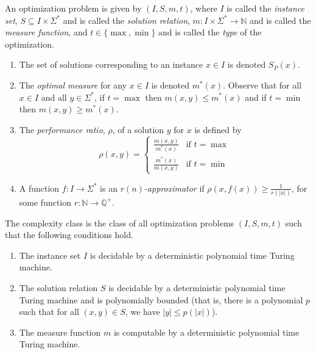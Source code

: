 \documentclass{article}
\begin{document}
\begin{definition}
  An optimization problem is given by $(I, S, m, t)$, where $I$ is called the \emph{instance set}, $S \subseteq I \times \Sigma^*$ and is called the \emph{solution relation}, $m \colon I \times \Sigma^* \to \mathbb{N}$ and is called the \emph{measure function}, and $t\in\{\max, \min\}$ and is called the \emph{type} of the optimization.
  \begin{enumerate}
  \item The set of solutions corresponding to an instance $x \in I$ is denoted $S_P(x)$.
  \item The \emph{optimal measure} for any $x \in I$ is denoted $m^*(x)$.
    Observe that for all $x \in I$ and all $y \in \Sigma^*$, if $t = \max$ then $m(x, y) \leq m^*(x)$ and if $t = \min$ then $m(x, y) \geq m^*(x)$.
  \item The \emph{performance ratio}, $\rho$, of a solution $y$ for $x$ is defined by
    \begin{equation*}
      \rho(x, y) =
      \begin{cases}
        \frac{m(x, y)}{m^*(x)} & \text{if } t = \max \\
        \frac{m^*(x)}{m(x, y)} & \text{if } t = \min
      \end{cases}
    \end{equation*}
  \item A function $f \colon I \to \Sigma^*$ is an \emph{$r(n)$-approximator} if $\rho(x, f(x)) \geq \frac{1}{r(|x|)}$, for some function $r \colon \mathbb{N} \to \mathbb{Q}^+$.
  \end{enumerate}
\end{definition}

\begin{definition}
  The complexity class \NPO{} is the class of all optimization problems $(I, S, m, t)$ such that the following conditions hold.
  \begin{enumerate}
  \item The instance set $I$ is decidable by a deterministic polynomial time Turing machine.
  \item The solution relation $S$ is decidable by a deterministic polynomial time Turing machine and is polynomially bounded (that is, there is a polynomial $p$ such that for all $(x, y) \in S$, we have $|y| \leq p(|x|)$).
  \item The measure function $m$ is computable by a deterministic polynomial time Turing machine.
  \end{enumerate}
\end{definition}
\end{document}
